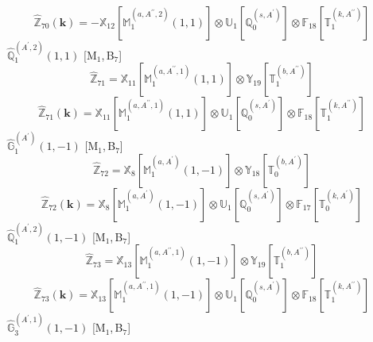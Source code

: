 \documentclass[fleqn,10pt,landscape]{article}
\begin{document}
\begin{itemize}
\begin{dmath*}
\hat{\mathbb{Z}}_{70}(\bm{k})=- \mathbb{X}_{12}[\mathbb{M}_{1}^{(a,A^{\prime\prime},2)}(1,1)] \otimes\mathbb{U}_{1}[\mathbb{Q}_{0}^{(s,A^{\prime})}] \otimes\mathbb{F}_{18}[\mathbb{T}_{1}^{(k,A^{\prime\prime})}]
\end{dmath*}
\vspace{4mm}
\noindent {} $\,\,\,\hat{\mathbb{Q}}_{1}^{(A^{\prime},2)}(1,1)$ [M$_{1}$,\,B$_{7}$]
\begin{dmath*}
\hat{\mathbb{Z}}_{71}=\mathbb{X}_{11}[\mathbb{M}_{1}^{(a,A^{\prime\prime},1)}(1,1)] \otimes\mathbb{Y}_{19}[\mathbb{T}_{1}^{(b,A^{\prime\prime})}]
\end{dmath*}
\begin{dmath*}
\hat{\mathbb{Z}}_{71}(\bm{k})=\mathbb{X}_{11}[\mathbb{M}_{1}^{(a,A^{\prime\prime},1)}(1,1)] \otimes\mathbb{U}_{1}[\mathbb{Q}_{0}^{(s,A^{\prime})}] \otimes\mathbb{F}_{18}[\mathbb{T}_{1}^{(k,A^{\prime\prime})}]
\end{dmath*}
\vspace{4mm}
\noindent {} $\,\,\,\hat{\mathbb{G}}_{1}^{(A^{\prime})}(1,-1)$ [M$_{1}$,\,B$_{7}$]
\begin{dmath*}
\hat{\mathbb{Z}}_{72}=\mathbb{X}_{8}[\mathbb{M}_{1}^{(a,A^{\prime})}(1,-1)] \otimes\mathbb{Y}_{18}[\mathbb{T}_{0}^{(b,A^{\prime})}]
\end{dmath*}
\begin{dmath*}
\hat{\mathbb{Z}}_{72}(\bm{k})=\mathbb{X}_{8}[\mathbb{M}_{1}^{(a,A^{\prime})}(1,-1)] \otimes\mathbb{U}_{1}[\mathbb{Q}_{0}^{(s,A^{\prime})}] \otimes\mathbb{F}_{17}[\mathbb{T}_{0}^{(k,A^{\prime})}]
\end{dmath*}
\vspace{4mm}
\noindent {} $\,\,\,\hat{\mathbb{Q}}_{1}^{(A^{\prime},2)}(1,-1)$ [M$_{1}$,\,B$_{7}$]
\begin{dmath*}
\hat{\mathbb{Z}}_{73}=\mathbb{X}_{13}[\mathbb{M}_{1}^{(a,A^{\prime\prime},1)}(1,-1)] \otimes\mathbb{Y}_{19}[\mathbb{T}_{1}^{(b,A^{\prime\prime})}]
\end{dmath*}
\begin{dmath*}
\hat{\mathbb{Z}}_{73}(\bm{k})=\mathbb{X}_{13}[\mathbb{M}_{1}^{(a,A^{\prime\prime},1)}(1,-1)] \otimes\mathbb{U}_{1}[\mathbb{Q}_{0}^{(s,A^{\prime})}] \otimes\mathbb{F}_{18}[\mathbb{T}_{1}^{(k,A^{\prime\prime})}]
\end{dmath*}
\vspace{4mm}
\noindent {} $\,\,\,\hat{\mathbb{G}}_{3}^{(A^{\prime},1)}(1,-1)$ [M$_{1}$,\,B$_{7}$]
\begin{dmath*}

\end{dmath*}
\end{itemize}
\end{document}
